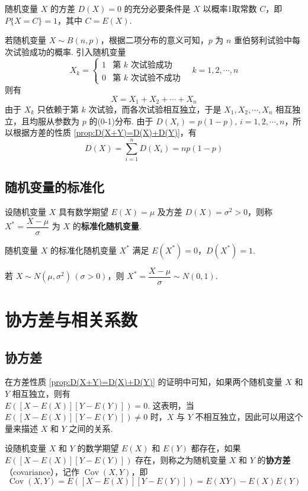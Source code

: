 \begin{property} \label{prop:D(X)=0}
    随机变量 $X$ 的方差 $D(X)=0$ 的充分必要条件是 $X$ 以概率1取常数 $C$，即 $P\{X=C\}=1$，其中 $C=E(X)$.
\end{property}

若随机变量 $X \sim B(n,p)$，根据二项分布的意义可知，$p$ 为 $n$ 重伯努利试验中每次试验成功的概率. 引入随机变量
$$
X_k = \begin{cases}
    1 & \text{第 $k$ 次试验成功} \\
    0 & \text{第 $k$ 次试验不成功}
\end{cases} \quad k=1,2,\cdots,n
$$
则有
$$
X = X_1 + X_2 + \cdots + X_n
$$
由于 $X_k$ 只依赖于第 $k$ 次试验，而各次试验相互独立，于是 $X_1, X_2, \cdots, X_n$ 相互独立，且均服从参数为 $p$ 的(0-1)分布. 由于 $D(X_i) = p(1-p), \, i=1,2,\cdots,n$，所以根据方差的性质 \ref*{prop:D(X+Y)=D(X)+D(Y)}，有
$$
D(X) = \sum_{i=1}^n D(X_i) = np(1-p)
$$

\subsection{随机变量的标准化}

设随机变量 $X$ 具有数学期望 $E(X)=\mu$ 及方差 $D(X) = \sigma^2 > 0$，则称 $X^* = \dfrac{X-\mu}{\sigma}$ 为 $X$ 的\textbf{标准化随机变量}.

随机变量 $X$ 的标准化随机变量 $X^*$ 满足 $E(X^*)=0$，$D(X^*)=1$.

若 $X \sim N(\mu,\sigma^2) \, (\sigma > 0)$，则 $X^* = \dfrac{X-\mu}{\sigma} \sim N(0,1)$.

\section{协方差与相关系数}

\subsection{协方差}

在方差性质 \ref*{prop:D(X+Y)=D(X)+D(Y)} 的证明中可知，如果两个随机变量 $X$ 和 $Y$ 相互独立，则有 \\
$E([X-E(X)][Y-E(Y)]) = 0$. 这表明，当 $E([X-E(X)][Y-E(Y)]) \not= 0$ 时，$X$ 与 $Y$ 不相互独立，因此可以用这个量来描述 $X$ 和 $Y$ 之间的关系.

\begin{definition}
    设随机变量 $X$ 和 $Y$ 的数学期望 $E(X)$ 和 $E(Y)$ 都存在，如果 $E([X-E(X)][Y-E(Y)])$ 存在，则称之为随机变量 $X$ 和 $Y$ 的\textbf{协方差}（covariance），记作 $\operatorname{Cov}(X,Y)$，即
    $$
    \operatorname{Cov}(X,Y) = E([X-E(X)][Y-E(Y)]) = E(XY) - E(X) E(Y)
    $$
\end{definition}

